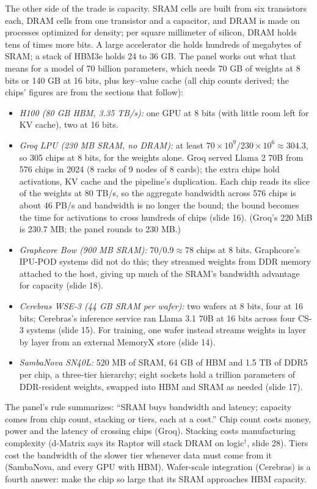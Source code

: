 \documentclass[11pt,letterpaper]{article}
\begin{document}
The other side of the trade is capacity. SRAM cells are built from six transistors each, DRAM cells from one transistor and a capacitor, and DRAM is made on processes optimized for density; per square millimeter of silicon, DRAM holds tens of times more bits. A large accelerator die holds hundreds of megabytes of SRAM; a stack of HBM3e holds 24 to 36 GB. The panel works out what that means for a model of 70 billion parameters, which needs 70 GB of weights at 8 bits or 140 GB at 16 bits, plus key--value cache (all chip counts derived; the chips' figures are from the sections that follow):
\begin{itemize}
\item \emph{H100 (80 GB HBM, 3.35 TB/s):} one GPU at 8 bits (with little room left for KV cache), two at 16 bits.
\item \emph{Groq LPU (230 MB SRAM, no DRAM):} at least $70\times10^9 / 230\times10^6 \approx 304.3$, so 305 chips at 8 bits, for the weights alone. Groq served Llama 2 70B from 576 chips in 2024 (8 racks of 9 nodes of 8 cards); the extra chips hold activations, KV cache and the pipeline's duplication. Each chip reads its slice of the weights at 80 TB/s, so the aggregate bandwidth across 576 chips is about 46 PB/s and bandwidth is no longer the bound; the bound becomes the time for activations to cross hundreds of chips (slide 16). (Groq's 220 MiB is 230.7 MB; the panel rounds to 230 MB.)
\item \emph{Graphcore Bow (900 MB SRAM):} $70 / 0.9 \approx 78$ chips at 8 bits. Graphcore's IPU-POD systems did not do this; they streamed weights from DDR memory attached to the host, giving up much of the SRAM's bandwidth advantage for capacity (slide 18).
\item \emph{Cerebras WSE-3 (44 GB SRAM per wafer):} two wafers at 8 bits, four at 16 bits; Cerebras's inference service ran Llama 3.1 70B at 16 bits across four CS-3 systems (slide 15). For training, one wafer instead streams weights in layer by layer from an external MemoryX store (slide 14).
\item \emph{SambaNova SN40L:} 520 MB of SRAM, 64 GB of HBM and 1.5 TB of DDR5 per chip, a three-tier hierarchy; eight sockets hold a trillion parameters of DDR-resident weights, swapped into HBM and SRAM as needed (slide 17).
\end{itemize}
The panel's rule summarizes: ``SRAM buys bandwidth and latency; capacity comes from chip count, stacking or tiers, each at a cost.'' Chip count costs money, power and the latency of crossing chips (Groq). Stacking costs manufacturing complexity (d-Matrix says its Raptor will stack DRAM on logic$^\dagger$, slide 28). Tiers cost the bandwidth of the slower tier whenever data must come from it (SambaNova, and every GPU with HBM). Wafer-scale integration (Cerebras) is a fourth answer: make the chip so large that its SRAM approaches HBM capacity.
\end{document}
